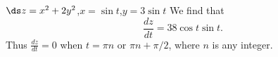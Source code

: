 {$\ds z=x^2+2y^2$,\qquad $x=\sin t$,\qquad $y=3\sin t$
}
{We find that $$\frac{dz}{dt} = 38\cos t\sin t.$$
Thus $\frac{dz}{dt} = 0$ when $t=\pi n$ or $\pi n+\pi/2$, where $n$ is any integer.}
